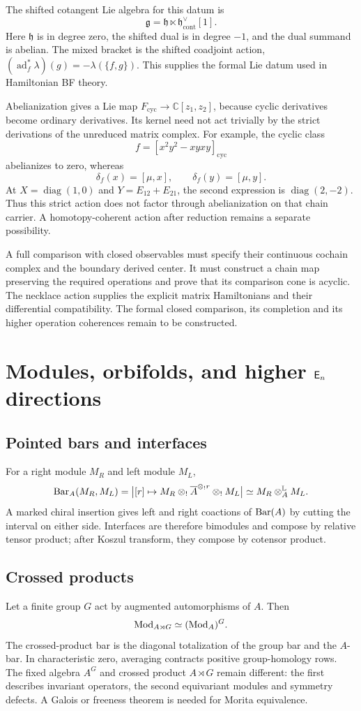 The shifted cotangent Lie algebra for this datum is
\[
 \mathfrak g=\mathfrak h\ltimes\mathfrak h^\vee_{\mathrm{cont}}[1].
\]
Here $\mathfrak h$ is in degree zero, the shifted dual is in degree $-1$,
and the dual summand is abelian.  The mixed bracket is the shifted
coadjoint action, $(\operatorname{ad}_f^*\lambda)(g)=-\lambda(\{f,g\})$.
This supplies the formal Lie datum used in Hamiltonian BF theory.

Abelianization gives a Lie map $F_{\mathrm{cyc}}\to\mathbb C[z_1,z_2]$,
because cyclic derivatives become ordinary derivatives.  Its kernel need
not act trivially by the strict derivations of the unreduced matrix complex.
For example, the cyclic class
\[
 f=[x^2y^2-xyxy]_{\mathrm{cyc}}
\]
abelianizes to zero, whereas
\[
 \delta_f(x)=[\mu,x],\qquad\delta_f(y)=[\mu,y].
\]
At $X=\operatorname{diag}(1,0)$ and $Y=E_{12}+E_{21}$, the second expression
is $\operatorname{diag}(2,-2)$.  Thus this strict action does not factor
through abelianization on that chain carrier.  A homotopy-coherent action
after reduction remains a separate possibility.

A full comparison with closed observables must specify their continuous
cochain complex and the boundary derived center.  It must construct a
chain map preserving the required operations and prove that its comparison
cone is acyclic.  The necklace action supplies the explicit matrix
Hamiltonians and their differential compatibility.  The formal closed
comparison, its completion and its higher operation coherences remain to be
constructed.

\chapter{Modules, orbifolds, and higher \(\mathsf E_n\) directions}

\section{Pointed bars and interfaces}
For a right module \(M_R\) and left module \(M_L\),
\[
 \operatorname{Bar}_A(M_R,M_L)=
 \bigl|[r]\mapsto M_R\mathbin{\otimes_{!}}\overline{A}^{\mathbin{\otimes_{!}} r}\mathbin{\otimes_{!}} M_L\bigr|
 \simeq M_R\otimes_A^{\mathbb L}M_L.
\]
A marked chiral insertion gives left and right coactions of \(\operatorname{Bar}(A)\) by cutting the interval on either side.  Interfaces are therefore bimodules and compose by relative tensor product; after Koszul transform, they compose by cotensor product.

\section{Crossed products}
Let a finite group \(G\) act by augmented automorphisms of \(A\).  Then
\[
 \operatorname{Mod}_{A\rtimes G}\simeq(\operatorname{Mod}_A)^G.
\]
The crossed-product bar is the diagonal totalization of the group bar and the \(A\)-bar.  In characteristic zero, averaging contracts positive group-homology rows.  The fixed algebra \(A^G\) and crossed product \(A\rtimes G\) remain different: the first describes invariant operators, the second equivariant modules and symmetry defects.  A Galois or freeness theorem is needed for Morita equivalence.

